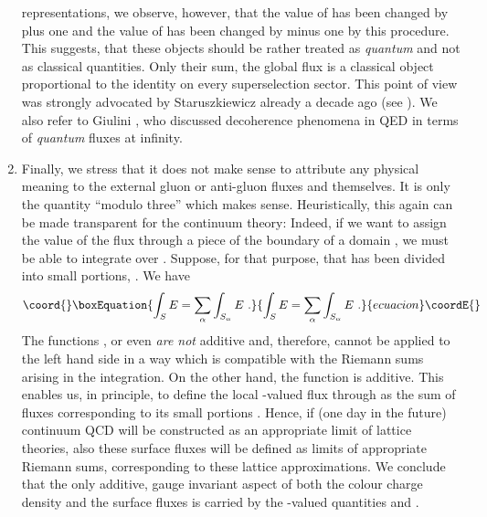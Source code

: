 \documentclass[a4paper,12pt]{article}
\begin{document}
\begin{enumerate}
representations, we observe, however, that the value of
\coordHE{} has been changed by plus one and the
value of \coordHE{} has been changed by minus one
by this procedure. This suggests, that these objects should be
rather treated as {\em quantum} and not as classical quantities.
Only their sum, the global flux \myHighlight{$\Phi_{\partial \Lambda}\, ,$}\coordHE{} is a
classical object proportional to the identity on every
superselection sector. This point of view was strongly advocated
by Staruszkiewicz already a decade ago (see \cite{Star}). We also
refer to Giulini \cite{Giu}, who discussed decoherence phenomena
in QED in terms of {\em quantum} fluxes at infinity.

\item
Finally, we stress that it does not make sense to attribute any
physical meaning to the external gluon or anti-gluon fluxes \coordHE{}
and \coordHE{} themselves. It is only the quantity \coordHE{} ``modulo
three'' which makes sense. Heuristically, this again can be made
transparent for the continuum theory: Indeed, if we want to assign
the value of the flux through a piece \coordHE{}
of the boundary of a domain \myHighlight{$\Sigma$}\coordHE{}, we must be able to integrate
\coordHE{} over \coordHE{}. Suppose, for that purpose, that \coordHE{} has been divided
into small portions, \coordHE{}. We have
\begin{equation}\coord{}\boxEquation{\label{sum}
  \int_S E = \sum_\alpha \int_{S_\alpha} E \ .
}{\int_S E = \sum_\alpha \int_{S_\alpha} E \ .
}{ecuacion}\coordE{}\end{equation}
The functions \coordHE{}, \coordHE{} or even \coordHE{} {\em are not} additive and,
therefore, cannot be applied to the left hand side in a way which
is compatible with the Riemann sums arising in the integration. On
the other hand, the function \myHighlight{$\varphi$}\coordHE{} is additive. This enables
us, in principle, to define the local \coordHE{}-valued flux
through \coordHE{} as the sum of fluxes corresponding to its small
portions \coordHE{}. Hence, if (one day in the future) continuum
QCD will be constructed as an appropriate limit of lattice
theories, also these surface fluxes will be defined as limits of
appropriate Riemann sums, corresponding to these lattice
approximations. We conclude that the only additive, gauge
invariant aspect of both the colour charge density \myHighlight{$\rho$}\coordHE{} and the
surface fluxes \coordHE{} is carried by the \coordHE{}-valued
quantities \myHighlight{$\varphi(\rho )$}\coordHE{} and \coordHE{}.
\end{enumerate}
\end{document}

